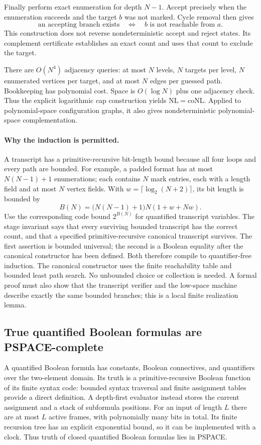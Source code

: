 Finally perform exact enumeration for depth $N-1$. Accept precisely when
the enumeration succeeds and the target $b$ was not marked. Cycle removal
then gives
\[
 \text{an accepting branch exists}
 \quad\Longleftrightarrow\quad
 b\text{ is not reachable from }a.
\]
This construction does not reverse nondeterministic accept and reject
states. Its complement certificate establishes an exact count and uses
that count to exclude the target.

There are $O(N^4)$ adjacency queries: at most $N$ levels, $N$ targets per
level, $N$ enumerated vertices per target, and at most $N$ edges per guessed
path. Bookkeeping has polynomial cost. Space is $O(\log N)$ plus one
adjacency check. Thus the explicit logarithmic cap construction yields
$\mathrm{NL}=\mathrm{coNL}$. Applied to polynomial-space configuration
graphs, it also gives nondeterministic polynomial-space complementation.

\paragraph{Why the induction is permitted.}
A transcript has a primitive-recursive bit-length bound because all four
loops and every path are bounded. For example, a padded format has at most
$N(N-1)+1$ enumerations; each contains $N$ mark entries, each with a length
field and at most $N$ vertex fields. With
$w=\lceil\log_2(N+2)\rceil$, its bit length is bounded by
\[
 B(N)=\bigl(N(N-1)+1\bigr)N(1+w+Nw).
\]
Use the corresponding code bound $2^{B(N)}$ for quantified transcript
variables. The stage invariant says that every surviving bounded transcript
has the correct count, and that a specified primitive-recursive canonical
transcript survives. The first assertion is bounded universal; the second
is a Boolean equality after the canonical constructor has been defined.
Both therefore compile to quantifier-free induction. The canonical
constructor uses the finite reachability table and bounded least path
search. No unbounded choice or collection is needed. A formal proof must
also show that the transcript verifier and the low-space machine describe
exactly the same bounded branches; this is a local finite realization lemma.

\subsection{True quantified Boolean formulas are PSPACE-complete}
\label{sec:tqbf}

A quantified Boolean formula has constants, Boolean connectives, and
quantifiers over the two-element domain. Its truth is a primitive-recursive
Boolean function of its finite syntax code: bounded syntax traversal and
finite assignment tables provide a direct definition. A depth-first
evaluator instead stores the current assignment and a stack of subformula
positions. For an input of length $L$ there are at most $L$ active frames,
with polynomially many bits in total. Its finite recursion tree has an
explicit exponential bound, so it can be implemented with a clock. Thus
truth of closed quantified Boolean formulas lies in PSPACE.

